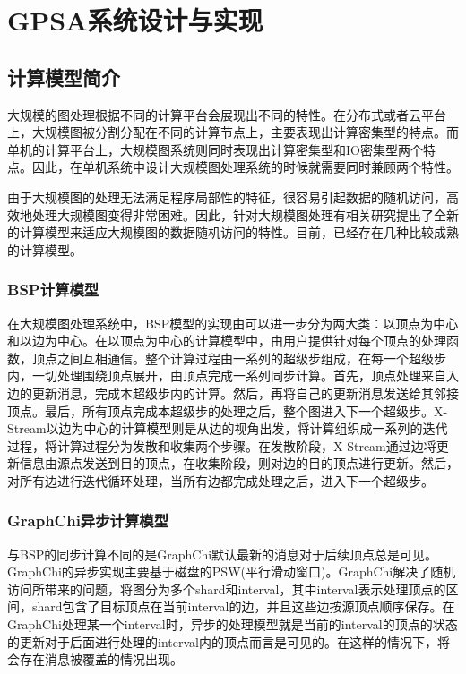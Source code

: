 
\chapter{GPSA系统设计与实现}

\section{计算模型简介}
大规模的图处理根据不同的计算平台会展现出不同的特性。在分布式或者云平台上，大规模图被分割分配在不同的计算节点上，主要表现出计算密集型的特点。而单机的计算平台上，大规模图系统则同时表现出计算密集型和IO密集型两个特点。因此，在单机系统中设计大规模图处理系统的时候就需要同时兼顾两个特性。

由于大规模图的处理无法满足程序局部性的特征，很容易引起数据的随机访问，高效地处理大规模图变得非常困难。因此，针对大规模图处理有相关研究提出了全新的计算模型来适应大规模图的数据随机访问的特性。目前，已经存在几种比较成熟的计算模型。

\subsection{BSP计算模型}

在大规模图处理系统中，BSP模型的实现由可以进一步分为两大类：以顶点为中心和以边为中心。在以顶点为中心的计算模型中，由用户提供针对每个顶点的处理函数，顶点之间互相通信。整个计算过程由一系列的超级步组成，在每一个超级步内，一切处理围绕顶点展开，由顶点完成一系列同步计算。首先，顶点处理来自入边的更新消息，完成本超级步内的计算。然后，再将自己的更新消息发送给其邻接顶点。最后，所有顶点完成本超级步的处理之后，整个图进入下一个超级步。X-Stream以边为中心的计算模型则是从边的视角出发，将计算组织成一系列的迭代过程，将计算过程分为发散和收集两个步骤。在发散阶段，X-Stream通过边将更新信息由源点发送到目的顶点，在收集阶段，则对边的目的顶点进行更新。然后，对所有边进行迭代循环处理，当所有边都完成处理之后，进入下一个超级步。

\subsection{GraphChi异步计算模型}
与BSP的同步计算不同的是GraphChi默认最新的消息对于后续顶点总是可见。GraphChi的异步实现主要基于磁盘的PSW(平行滑动窗口)。GraphChi解决了随机访问所带来的问题，将图分为多个shard和interval，其中interval表示处理顶点的区间，shard包含了目标顶点在当前interval的边，并且这些边按源顶点顺序保存。在GraphChi处理某一个interval时，异步的处理模型就是当前的interval的顶点的状态的更新对于后面进行处理的interval内的顶点而言是可见的。在这样的情况下，将会存在消息被覆盖的情况出现。


